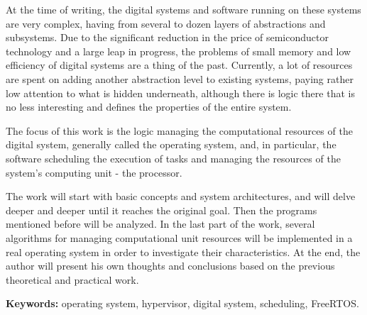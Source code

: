 \documentclass[../main]{subfiles}
\begin{document}
At the time of writing, the digital systems and software running on these systems are very complex, having from several to dozen layers of abstractions and subsystems. Due to the significant reduction in the price of semiconductor technology and a large leap in progress, the problems of small memory and low efficiency of digital systems are a thing of the past. Currently, a lot of resources are spent on adding another abstraction level to existing systems, paying rather low attention to what is hidden underneath, although there is logic there that is no less interesting and defines the properties of the entire system.

The focus of this work is the logic managing the computational resources of the digital system, generally called the operating system, and, in particular, the software scheduling the execution of tasks and managing the resources of the system's computing unit - the processor.

The work will start with basic concepts and system architectures, and will delve deeper and deeper until it reaches the original goal. Then the programs mentioned before will be analyzed. In the last part of the work, several algorithms for managing computational unit resources will be implemented in a real operating system in order to investigate their characteristics. At the end, the author will present his own thoughts and conclusions based on the previous theoretical and practical work.

\textbf{Keywords:} operating system, hypervisor, digital system, scheduling, FreeRTOS.
\end{document}
